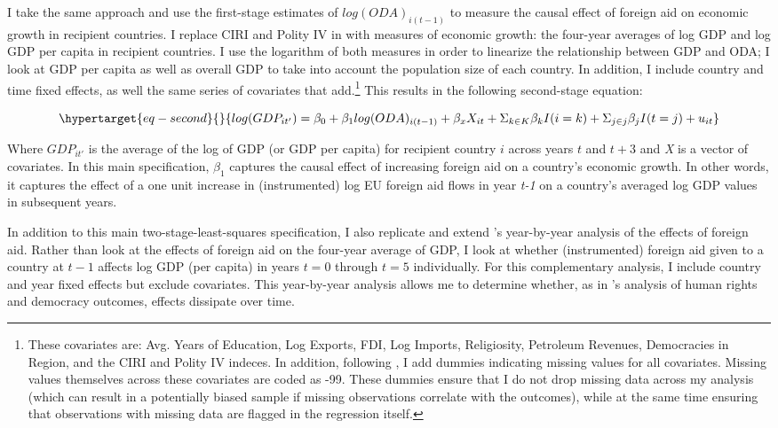 \documentclass[12pt, ]{article}
\begin{document}
I take the same approach and use the first-stage estimates of
\(log(ODA)_{i(t-1)}\) to measure the causal effect of foreign aid on
economic growth in recipient countries. I replace CIRI and Polity IV in
\citet{carnegie2017foreign} with measures of economic growth: the
four-year averages of log GDP and log GDP per capita in recipient
countries. I use the logarithm of both measures in order to linearize
the relationship between GDP and ODA; I look at GDP per capita as well
as overall GDP to take into account the population size of each country.
In addition, I include country and time fixed effects, as well the same
series of covariates that \citet{carnegie2017foreign} add.\footnote{These
  covariates are: Avg. Years of Education, Log Exports, FDI, Log
  Imports, Religiosity, Petroleum Revenues, Democracies in Region, and
  the CIRI and Polity IV indeces. In addition, following
  \citet{carnegie2017foreign}, I add dummies indicating missing values
  for all covariates. Missing values themselves across these covariates
  are coded as -99. These dummies ensure that I do not drop missing data
  across my analysis (which can result in a potentially biased sample if
  missing observations correlate with the outcomes), while at the same
  time ensuring that observations with missing data are flagged in the
  regression itself.} This results in the following second-stage
equation:

\begin{equation}\protect\hypertarget{eq-second}{}{
log(GDP_{it'}) = \beta_{0} + \beta_{1}log(ODA)_{i(t-1)}  + \beta_{x}X_{it} +\Sigma_{k \in K} \beta_{k}I(i=k) +\Sigma_{j \in j} \beta_{j}I(t=j) + u_{it}
}\label{eq-second}\end{equation}

Where \(GDP_{it'}\) is the average of the log of GDP (or GDP per capita)
for recipient country \(i\) across years \(t\) and \(t+3\) and \emph{X}
is a vector of covariates. In this main specification, \(\beta_{1}\)
captures the causal effect of increasing foreign aid on a country's
economic growth. In other words, it captures the effect of a one unit
increase in (instrumented) log EU foreign aid flows in year \emph{t-1}
on a country's averaged log GDP values in subsequent years.

In addition to this main two-stage-least-squares specification, I also
replicate and extend \citet{carnegie2017foreign}'s year-by-year analysis
of the effects of foreign aid. Rather than look at the effects of
foreign aid on the four-year average of GDP, I look at whether
(instrumented) foreign aid given to a country at \(t-1\) affects log GDP
(per capita) in years \(t=0\) through \(t=5\) individually. For this
complementary analysis, I include country and year fixed effects but
exclude covariates. This year-by-year analysis allows me to determine
whether, as in \citet{carnegie2017foreign}'s analysis of human rights
and democracy outcomes, effects dissipate over time.
\end{document}
